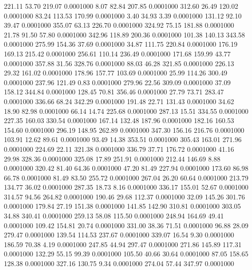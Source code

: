  221.11   53.70  219.07   0.0001000
   8.07   82.84  207.85   0.0001000
 312.60   26.49  120.02   0.0001000
  83.24  113.53  170.99   0.0001000
   3.40   34.93    3.39   0.0001000
 131.12   92.10   39.47   0.0001000
 355.07   63.13  226.70   0.0001000
 324.92   75.15  181.88   0.0001000
  21.78   91.50   57.80   0.0001000
 342.96  118.89  200.36   0.0001000
 101.38  140.13  343.58   0.0001000
 275.99  154.36   37.69   0.0001000
  34.87  111.75  220.84   0.0001000
 176.19  169.13  215.42   0.0001000
 256.61  110.14  236.49   0.0001000
 171.68  159.99   43.77   0.0001000
 357.88   31.56  328.76   0.0001000
  88.03   46.28  321.85   0.0001000
 226.13   29.32  161.02   0.0001000
 178.96  157.77  103.69   0.0001000
  25.99  114.26  300.49   0.0001000
 237.96  121.49    0.83   0.0001000
 279.96   22.56  309.09   0.0001000
  37.09  158.12  344.84   0.0001000
 128.45   70.81  356.46   0.0001000
  27.79   73.71  283.47   0.0001000
 336.66   68.24  342.29   0.0001000
 191.48   22.71  131.43   0.0001000
  34.62   18.90   82.98   0.0001000
  66.14   14.74  225.68   0.0001000
 287.13   15.51  334.55   0.0001000
 227.35  160.03  330.54   0.0001000
 167.14  132.48  187.96   0.0001000
 182.16  160.53  154.60   0.0001000
 296.19  148.95  262.89   0.0001000
 347.30  156.16  216.76   0.0001000
 103.91   12.62   89.61   0.0001000
  93.49   14.38  353.51   0.0001000
 305.43  163.01  271.96   0.0001000
 224.69   22.11  321.38   0.0001000
 336.79   37.71  176.72   0.0001000
  41.16   29.98  328.36   0.0001000
 325.08   17.89  251.91   0.0001000
 212.44  146.69    8.88   0.0001000
 320.42   81.40   64.36   0.0001000
  47.20   81.49  227.94   0.0001000
 173.60   86.98   66.78   0.0001000
  81.49   83.50  255.72   0.0001000
 267.04   26.20   60.64   0.0001000
 213.79  134.77   36.02   0.0001000
 287.35   18.73    8.16   0.0001000
 336.17  155.01   52.67   0.0001000
 314.57   94.56  264.82   0.0001000
 190.46   29.68  112.37   0.0001000
  32.09  145.26  301.76   0.0001000
 179.84   27.19  151.38   0.0001000
 141.85  142.90  310.81   0.0001000
 303.05   34.88  340.41   0.0001000
 259.13   58.08  115.50   0.0001000
 248.94  164.69   49.41   0.0001000
 109.42  154.81   20.74   0.0001000
 331.00   38.36   71.51   0.0001000
  96.88   28.09  279.47   0.0001000
 139.54  114.53  237.67   0.0001000
 339.07   16.54    9.30   0.0001000
 186.59   70.38    4.19   0.0001000
 247.85   44.94  297.47   0.0001000
 271.86  145.89  117.31   0.0001000
 132.29   55.15   99.39   0.0001000
 105.50   40.66   30.64   0.0001000
  87.05  158.65  128.38   0.0001000
 327.16  130.75    9.34   0.0001000
 274.04   57.44  347.97   0.0001000
